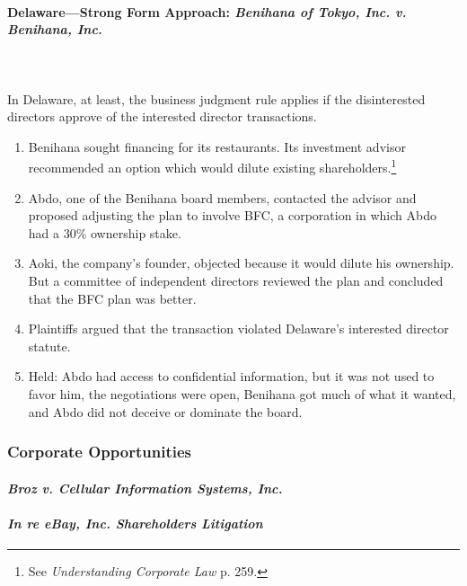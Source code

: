 \paragraph{Delaware---Strong Form Approach: \emph{Benihana of Tokyo, Inc. v. 
Benihana, Inc.}}
~\\\\
In Delaware, at least, the business judgment rule applies if the disinterested 
directors approve of the interested director transactions.

\begin{enumerate}
    \item Benihana sought financing for its restaurants. Its investment advisor 
    recommended an option which would dilute existing shareholders.\footnote{See 
    \emph{Understanding Corporate Law} p. 259.}
    \item Abdo, one of the Benihana board members, contacted the advisor and 
    proposed adjusting the plan to involve BFC, a corporation in which Abdo had 
    a 30\% ownership stake.
    \item Aoki, the company's founder, objected because it would dilute his 
    ownership. But a committee of independent directors reviewed the plan and 
    concluded that the BFC plan was better.
    \item Plaintiffs argued that the transaction violated Delaware's interested 
    director statute.
    \item Held: Abdo had access to confidential information, but it was not used 
    to favor him, the negotiations were open, Benihana got much of what it 
    wanted, and Abdo did not deceive or dominate the board.
\end{enumerate}

\subsubsection{Corporate Opportunities}

\paragraph{\emph{Broz v. Cellular Information Systems, Inc.}}


\paragraph{\emph{In re eBay, Inc. Shareholders Litigation}}

